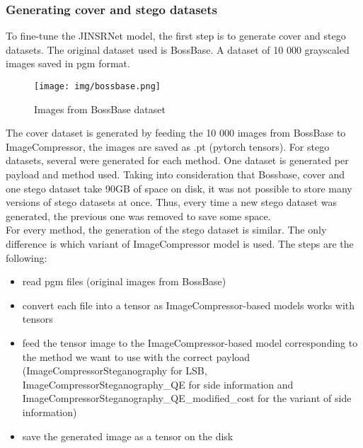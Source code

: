 \documentclass[12pt]{article}
\begin{document}
\subsubsection{Generating cover and stego datasets}
To fine-tune the JINSRNet model, the first step is to generate cover and stego datasets. The original dataset used is BossBase. A dataset of 10 000 grayscaled images saved in pgm format. 

\begin{figure}[H]
    \texttt{[image: img/bossbase.png]}
    \caption[BossBase]{Images from BossBase dataset}
    \label{fig:bossbase}
\end{figure}

The cover dataset is generated by feeding the 10 000 images from BossBase to ImageCompressor, the images are saved as .pt (pytorch tensors). For stego datasets, several were generated for each method. One dataset is generated per payload and method used. Taking into consideration that Bossbase, cover and one stego dataset take 90GB of space on disk, it was not possible to store many versions of stego datasets at once. Thus, every time a new stego dataset was generated, the previous one was removed to save some space.\\
For every method, the generation of the stego dataset is similar. The only difference is which variant of ImageCompressor model is used. The steps are the following:
\begin{itemize}
    \item read pgm files (original images from BossBase)
    \item convert each file into a tensor as ImageCompressor-based models works with tensors
    \item feed the tensor image to the ImageCompressor-based model corresponding to the method we want to use with the correct payload (ImageCompressorSteganography for LSB, ImageCompressorSteganography\_QE for side information and ImageCompressorSteganography\_QE\_modified\_cost for the variant of side information)
    \item save the generated image as a tensor on the disk
\end{itemize}
\end{document}
